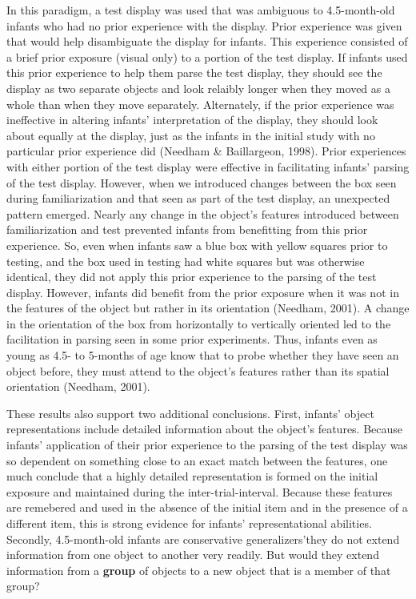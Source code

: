 In this paradigm, a test display was used that was ambiguous to
4.5-month-old infants who had no prior experience with the display.
Prior experience was given that would help disambiguate the display
for infants.  This experience consisted of a brief prior exposure
(visual only) to a portion of the test display.  If infants used this
prior experience to help them parse the test display, they should see
the display as two separate objects and look relaibly longer when they
moved as a whole than when they move separately.  Alternately, if the
prior experience was ineffective in altering infants'
interpretation of the display, they should look about equally at the
display, just as the infants in the initial study with no particular
prior experience did (Needham \& Baillargeon, 1998).  Prior experiences
with either portion of the test display were effective in facilitating
infants' parsing of the test display.  However, when we
introduced changes between the box seen during familiarization and
that seen as part of the test display, an unexpected pattern emerged.
Nearly any change in the object's features introduced between
familiarization and test prevented infants from benefitting from this
prior experience.  So, even when infants saw a blue box with yellow
squares prior to testing, and the box used in testing had white
squares but was otherwise identical, they did not apply this prior
experience to the parsing of the test display.  However, infants did
benefit from the prior exposure when it was not in the features of the
object but rather in its orientation (Needham, 2001).  A change in the
orientation of the box from horizontally to vertically oriented led to
the facilitation in parsing seen in some prior experiments.  Thus,
infants even as young as 4.5- to 5-months of age know that to probe
whether they have seen an object before, they must attend to the
object's features rather than its spatial orientation
(Needham, 2001).

These results also support two additional conclusions.  First,
infants' object representations include detailed information
about the object's features.  Because infants'
application of their prior experience to the parsing of the test
display was so dependent on something close to an exact match between
the features, one much conclude that a highly detailed representation
is formed on the initial exposure and maintained during the
inter-trial-interval.  Because these features are remebered and used
in the absence of the initial item and in the presence of a different
item, this is strong evidence for infants' representational
abilities.  Secondly, 4.5-month-old infants are conservative
generalizers'they do not extend information from one object to
another very readily.  But would they extend information from a {\bf group}
of objects to a new object that is a member of that group?

